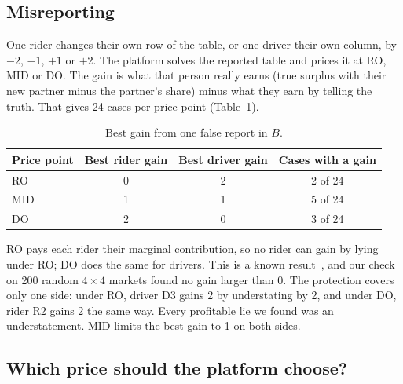 \documentclass[11pt,a4paper]{article}
\begin{document}
\subsection{Misreporting}

One rider changes their own row of the table, or one driver their own column, by $-2$, $-1$, $+1$ or $+2$. The platform solves the reported table and prices it at RO, MID or DO. The gain is what that person really earns (true surplus with their new partner minus the partner's share) minus what they earn by telling the truth. That gives 24 cases per price point (Table~\ref{tab:manip}).

\begin{table}[h]
\centering\small
\begin{tabular}{lccc}
\toprule
Price point & Best rider gain & Best driver gain & Cases with a gain \\
\midrule
RO  & 0 & 2 & 2 of 24 \\
MID & 1 & 1 & 5 of 24 \\
DO  & 2 & 0 & 3 of 24 \\
\bottomrule
\end{tabular}
\caption{Best gain from one false report in $B$.}
\label{tab:manip}
\end{table}

RO pays each rider their marginal contribution, so no rider can gain by lying under RO; DO does the same for drivers. This is a known result~\cite{leonard,dgs}, and our check on 200 random $4\times4$ markets found no gain larger than 0. The protection covers only one side: under RO, driver D3 gains 2 by understating by 2, and under DO, rider R2 gains 2 the same way. Every profitable lie we found was an understatement. MID limits the best gain to 1 on both sides.

\subsection{Which price should the platform choose?}
\end{document}
